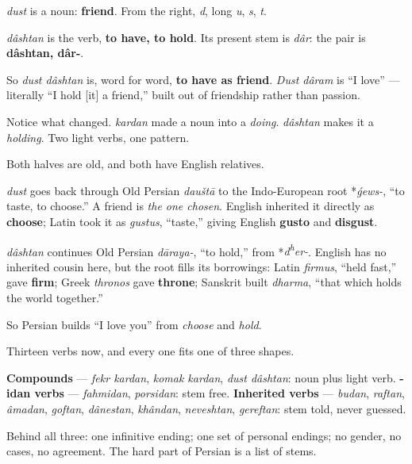 \textbf{} \emph{dust} is a noun: \textbf{friend}. From the right, \textbf{} \emph{d}, \textbf{} long \emph{u}, \textbf{} \emph{s}, \textbf{} \emph{t}.

\textbf{} \emph{dâshtan} is the verb, \textbf{to have, to hold}. Its present stem is \emph{dâr}: the pair is \textbf{dâshtan, dâr-}.

So \emph{dust dâshtan} is, word for word, \textbf{to have as friend}. \emph{Dust dâram} is “I love” — literally “I hold {[}it{]} a friend,” built out of friendship rather than passion.

Notice what changed. \emph{kardan} made a noun into a \emph{doing}. \textbf{} \emph{dâshtan} makes it a \emph{holding}. Two light verbs, one pattern.

\begin{cousinweb}
Both halves are old, and both have English relatives.

\textbf{} \emph{dust} goes back through Old Persian \emph{dauštā} to the Indo-European root *\emph{ǵews-}, “to taste, to choose.” A friend is \emph{the one chosen}. English inherited it directly as \textbf{choose}; Latin took it as \emph{gustus}, “taste,” giving English \textbf{gusto} and \textbf{disgust}.

\textbf{} \emph{dâshtan} continues Old Persian \emph{dāraya-}, “to hold,” from *\emph{d\textsuperscript{h}er-}. English has no inherited cousin here, but the root fills its borrowings: Latin \emph{firmus}, “held fast,” gave \textbf{firm}; Greek \emph{thronos} gave \textbf{throne}; Sanskrit built \emph{dharma}, “that which holds the world together.”

So Persian builds “I love you” from \emph{choose} and \emph{hold}.
\end{cousinweb}

\begin{grammarlens}[title={Grammar Lens: what the two chapters add up to}]
Thirteen verbs now, and every one fits one of three shapes.

\textbf{Compounds} — \emph{fekr kardan}, \emph{komak kardan}, \emph{dust dâshtan}: noun plus light verb. \textbf{-idan verbs} — \emph{fahmidan}, \emph{porsidan}: stem free. \textbf{Inherited verbs} — \emph{budan}, \emph{raftan}, \emph{âmadan}, \emph{goftan}, \emph{dânestan}, \emph{khândan}, \emph{neveshtan}, \emph{gereftan}: stem told, never guessed.

Behind all three: one infinitive ending; one set of personal endings; no gender, no cases, no agreement. The hard part of Persian is a list of stems.
\end{grammarlens}

